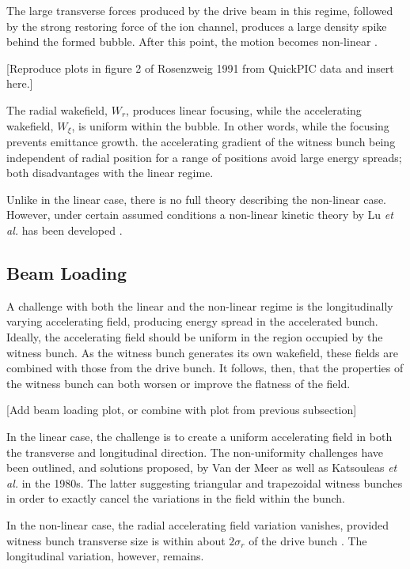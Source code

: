 The large transverse forces produced by the drive beam in this regime, followed by the strong restoring force of the ion channel, produces a large density spike behind the formed bubble. After this point, the motion becomes non-linear \cite{dawson:1959,rosenzweig:1991}.

[Reproduce plots in figure 2 of Rosenzweig 1991 from QuickPIC data and insert here.]

The radial wakefield, $W_{r}$, produces linear focusing, while the accelerating wakefield, $W_{\xi}$, is uniform within the bubble. In other words, while the focusing prevents emittance growth. the accelerating gradient of the witness bunch being independent of radial position for a range of positions avoid large energy spreads; both disadvantages with the linear regime.

Unlike in the linear case, there is no full theory describing the non-linear case. However, under certain assumed conditions a non-linear kinetic theory by Lu \textit{et al.} has been developed \cite{lu:2006a,lu:2006}.

\subsection{Beam Loading}
\label{Int:BPI:BLoad}

A challenge with both the linear and the non-linear regime is the longitudinally varying accelerating field, producing energy spread in the accelerated bunch. Ideally, the accelerating field should be uniform in the region occupied by the witness bunch. As the witness bunch generates its own wakefield, these fields are combined with those from the drive bunch. It follows, then, that the properties of the witness bunch can both worsen or improve the flatness of the field.

[Add beam loading plot, or combine with plot from previous subsection]

In the linear case, the challenge is to create a uniform accelerating field in both the transverse and longitudinal direction. The non-uniformity challenges have been outlined, and solutions proposed, by Van der Meer \cite{van_der_meer:1985} as well as Katsouleas \textit{et al.} \cite{katsouleas:1987} in the 1980s. The latter suggesting triangular and trapezoidal witness bunches in order to exactly cancel the variations in the field within the bunch.

In the non-linear case, the radial accelerating field variation vanishes, provided witness bunch transverse size is within about $2\sigma_{r}$ of the drive bunch \cite{rosenzweig:1991}. The longitudinal variation, however, remains.

